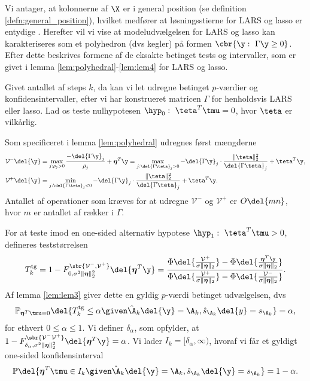 Vi antager, at kolonnerne af \(\X\) er i general position (se definition \ref{defn:general_position}), hvilket medfører at løsningsstierne for LARS og lasso er entydige \citep{lasso_unique}. 
Herefter vil vi vise at modeludvælgelsen for LARS og lasso kan karakteriseres som et polyhedron (dvs kegler) på formen \(\cbr{\y : \ \Gamma \y \geq 0}\).
Efter dette beskrives formene af de eksakte betinget tests og intervaller, som er givet i lemma \ref{lem:polyhedral}-\ref{lem:lem4} for LARS og lasso.

%

Givet antallet af steps \(k\), da kan vi let udregne betinget \(p\)-værdier og konfidensintervaller, efter vi har konstrueret matricen \(\Gamma\) for henholdsvis LARS eller lasso.
Lad os teste nulhypotesen \(\hyp_0: \ \teta^T \tmu = 0\), hvor \(\teta\) er vilkårlig.

Som specificeret i lemma \ref{lem:polyhedral} udregnes først mængderne
\begin{align*}
\mathcal{V}^- \del{\y} &=  \max_{j: \rho_j > 0} \frac{- \del{\Gamma \y}_j}{\rho_j} + \boldsymbol{\eta}^T \y = \max_{j: \del{\Gamma \teta}_j > 0} - \del{\Gamma \y}_j \cdot \frac{\Vert \teta \Vert_2^2}{\del{\Gamma \teta}_j} + \teta^T \y, \\
\mathcal{V}^+ \del{\y} &=\min_{j: \del{\Gamma \teta}_j < 0} - \del{\Gamma \y}_j \cdot \frac{\Vert \teta \Vert_2^2}{\del{\Gamma \teta}_j} + \teta^T \y.
\end{align*}
Antallet af operationer som kræves for at udregne \(\mathcal{V}^-\) og \(\mathcal{V}^+\) er \(O \del{mn}\), hvor \(m\) er antallet af rækker i \(\Gamma\).

For at teste imod en one-sided alternativ hypotese \(\hyp_1: \ \teta^T \tmu > 0\),  defineres teststørrelsen
\begin{align*}
T_k^\text{tg}=1- F_{0, \sigma^2 \Vert \boldsymbol{\eta} \Vert_2^2}^{\sbr{\mathcal{V}^-, \mathcal{V}^+}} \del{\boldsymbol{\eta}^T \y} = \frac{\Phi \del{\frac{\mathcal{V}^+}{\sigma \Vert \boldsymbol{\eta} \Vert_2}}-\Phi \del{\frac{\boldsymbol{\eta}^T \y}{\sigma  \Vert \boldsymbol{\eta} \Vert_2}}}{\Phi \del{\frac{\mathcal{V}^+}{\sigma  \Vert \boldsymbol{\eta} \Vert_2}}-\Phi \del{\frac{\mathcal{V}^-}{\sigma \Vert \boldsymbol{\eta} \Vert_2}}}.
\end{align*}
Af lemma \ref{lem:lem3} giver dette en gyldig \(p\)-værdi betinget udvælgelsen, dvs
\begin{align}
\mathbb{P}_{\boldsymbol{\eta}^T \tmu = 0} \del{T_k^\text{tg} \leq \alpha \given \hat{\A}_k \del{\y} = \A_k, \hat{s}_{\A_k} \del{y} = s_{\A_k}} = \alpha, \label{eq:post_32}
\end{align}
for ethvert \(0 \leq \alpha \leq 1\).
Vi definer  \(\delta_\alpha\), som opfylder, at \(1-F_{\delta_{\alpha}, \sigma^2 \Vert \boldsymbol{\eta} \Vert_2^2}^{\sbr{\mathcal{V}^- \mathcal{V}^+}} \del{\boldsymbol{\eta}^T \y} = \alpha\).
Vi lader \(I_k = [\delta_\alpha, \infty)\), hvoraf vi får et gyldigt one-sided konfidensinterval
\begin{align}
\mathbb{P} \del{\boldsymbol{\eta}^T \tmu \in I_k \given \hat{\A}_k \del{\y} = \A_k, \hat{s}_{\A_k} \del{\y} = s_{\A_k}} = 1-\alpha. \label{eq:post_33}
\end{align}

